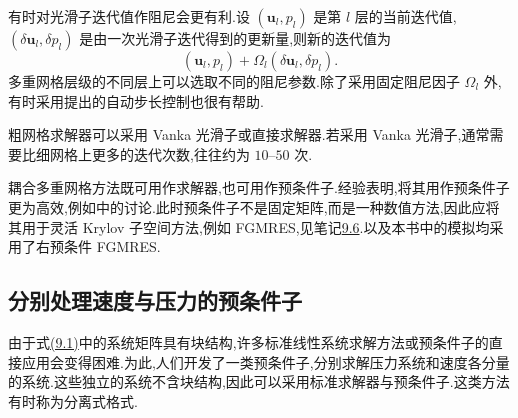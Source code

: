 

\begin{note}[光滑子迭代的阻尼]
\label{note:chapter9-smoother-damping}
有时对光滑子迭代值作阻尼会更有利.设 $(\bm u_l,p_l)$ 是第 $l$ 层的当前迭代值,$(\delta\bm u_l,\delta p_l)$ 是由一次光滑子迭代得到的更新量,则新的迭代值为
\[
 (\bm u_l,p_l)+\Omega_l(\delta\bm u_l,\delta p_l).
\]
多重网格层级的不同层上可以选取不同的阻尼参数.除了采用固定阻尼因子 $\Omega_l$ 外,有时采用\textcite{JohnTobiska2000}提出的自动步长控制也很有帮助.
\end{note}

\begin{note}[粗网格求解器]
\label{note:chapter9-coarse-grid-solver}
粗网格求解器可以采用 Vanka 光滑子或直接求解器.若采用 Vanka 光滑子,通常需要比细网格上更多的迭代次数,往往约为 $10$--$50$ 次.
\end{note}

\begin{note}[耦合多重网格方法作为求解器或预条件子]
\label{note:chapter9-coupled-multigrid-as-preconditioner}
耦合多重网格方法既可用作求解器,也可用作预条件子.经验表明,将其用作预条件子更为高效,例如\textcite{John2002}中的讨论.此时预条件子不是固定矩阵,而是一种数值方法,因此应将其用于灵活 Krylov 子空间方法,例如 FGMRES,见笔记\hyperref[note:chapter9-iterative-solvers]{9.6}.\textcite{John2002,John2006}以及本书中的模拟均采用了右预条件 FGMRES.
\end{note}

\subsection{分别处理速度与压力的预条件子}
\label{sec:chapter9-decoupled-preconditioners}

\begin{note}[动机]
\label{note:chapter9-decoupled-motivation}
由于式\hyperref[eq:chapter9-coupled-system]{(9.1)}中的系统矩阵具有块结构,许多标准线性系统求解方法或预条件子的直接应用会变得困难.为此,人们开发了一类预条件子,分别求解压力系统和速度各分量的系统.这些独立的系统不含块结构,因此可以采用标准求解器与预条件子.这类方法有时称为分离式格式.
\end{note}



